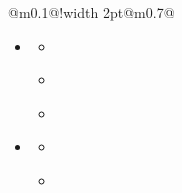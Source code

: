 \documentclass{article}
\begin{document}
\begin{tabular}{@{\hspace{0.05\textwidth}}m{}@{\hspace{0.05\textwidth}}!{\color{secondaryBlue}\vline width 2pt}@{}m{0.7\textwidth}@{}}
\begin{itemize}[label={}, topsep=0pt, partopsep=0pt, itemsep=0.5pt, parsep=2pt]
\begin{itemize}[label={\textcolor{gray!80}{\checkmark}}, topsep=0pt, partopsep=0pt, itemsep=0.5pt, parsep=2pt]
            \item \textcolor{gray!80}{}
            \item \textcolor{gray!80}{}
        \end{itemize}
        \item \textcolor{darkGray}{}
        \begin{itemize}[label={\textcolor{gray!80}{\checkmark}}, topsep=0pt, partopsep=0pt, itemsep=0.5pt, parsep=2pt] 
            \item \textcolor{gray!80}{}
            \item \textcolor{gray!80}{}
            \item \textcolor{gray!80}{}
        \end{itemize}
        \item \textcolor{darkGray}{}
        \begin{itemize}[label={\textcolor{gray!80}{\checkmark}}, topsep=0pt, partopsep=0pt, itemsep=0.5pt, parsep=2pt, after=\vspace*{-\baselineskip}] %
            \item \textcolor{gray!80}{}
            \item \textcolor{gray!80}{}
        \end{itemize}
    \end{itemize}
\end{tabular}
\end{document}
